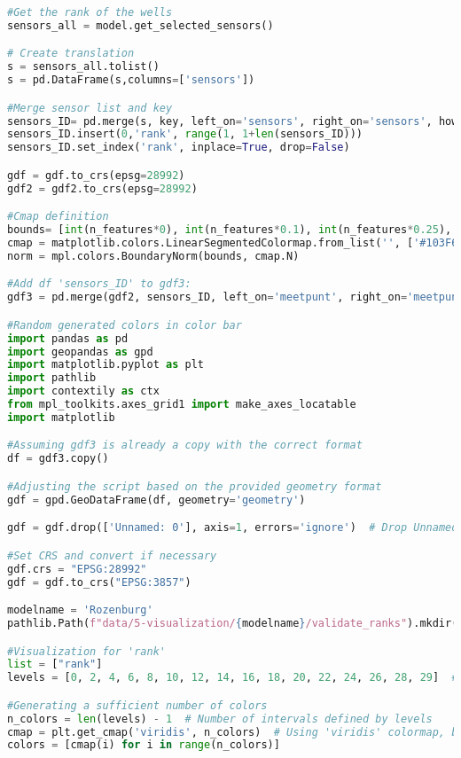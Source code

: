 \begin{lstlisting}[language=Python]
#Get the rank of the wells
sensors_all = model.get_selected_sensors()

# Create translation
s = sensors_all.tolist()
s = pd.DataFrame(s,columns=['sensors'])

#Merge sensor list and key
sensors_ID= pd.merge(s, key, left_on='sensors', right_on='sensors', how='left')
sensors_ID.insert(0,'rank', range(1, 1+len(sensors_ID)))
sensors_ID.set_index('rank', inplace=True, drop=False)

gdf = gdf.to_crs(epsg=28992)
gdf2 = gdf2.to_crs(epsg=28992)

#Cmap definition
bounds= [int(n_features*0), int(n_features*0.1), int(n_features*0.25), int(n_features*0.5),int(n_features*0.75),int(n_features*0.9), int(n_features*1)]
cmap = matplotlib.colors.LinearSegmentedColormap.from_list('', ['#103F6E','#5AA2CC','#DEEEF7','#FBD9CA','#EF8A62','#941F2D'])
norm = mpl.colors.BoundaryNorm(bounds, cmap.N)

#Add df 'sensors_ID' to gdf3: 
gdf3 = pd.merge(gdf2, sensors_ID, left_on='meetpunt', right_on='meetpunt', sort=False, how='right').to_crs(epsg=28992)

#Random generated colors in color bar  
import pandas as pd
import geopandas as gpd
import matplotlib.pyplot as plt
import pathlib
import contextily as ctx
from mpl_toolkits.axes_grid1 import make_axes_locatable
import matplotlib

#Assuming gdf3 is already a copy with the correct format
df = gdf3.copy()

#Adjusting the script based on the provided geometry format
gdf = gpd.GeoDataFrame(df, geometry='geometry')

gdf = gdf.drop(['Unnamed: 0'], axis=1, errors='ignore')  # Drop Unnamed if exists

#Set CRS and convert if necessary
gdf.crs = "EPSG:28992"
gdf = gdf.to_crs("EPSG:3857")

modelname = 'Rozenburg'
pathlib.Path(f"data/5-visualization/{modelname}/validate_ranks").mkdir(parents=True, exist_ok=True)

#Visualization for 'rank'
list = ["rank"]
levels = [0, 2, 4, 6, 8, 10, 12, 14, 16, 18, 20, 22, 24, 26, 28, 29]  # Adjust levels based on your 'rank' data specifics

#Generating a sufficient number of colors
n_colors = len(levels) - 1  # Number of intervals defined by levels
cmap = plt.get_cmap('viridis', n_colors)  # Using 'viridis' colormap, but you can choose another
colors = [cmap(i) for i in range(n_colors)]


\end{lstlisting}
